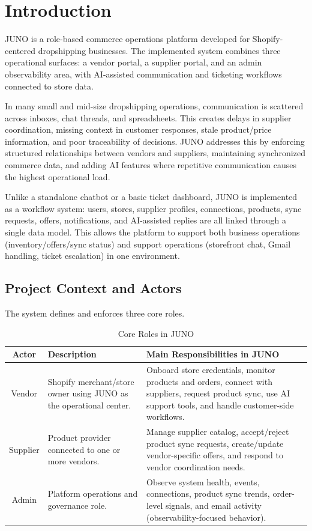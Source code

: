 \chapter{Introduction}
\label{sec:introduction}

JUNO is a role-based commerce operations platform developed for Shopify-centered dropshipping businesses. The implemented system combines three operational surfaces: a vendor portal, a supplier portal, and an admin observability area, with AI-assisted communication and ticketing workflows connected to store data.

In many small and mid-size dropshipping operations, communication is scattered across inboxes, chat threads, and spreadsheets. This creates delays in supplier coordination, missing context in customer responses, stale product/price information, and poor traceability of decisions. JUNO addresses this by enforcing structured relationships between vendors and suppliers, maintaining synchronized commerce data, and adding AI features where repetitive communication causes the highest operational load.

Unlike a standalone chatbot or a basic ticket dashboard, JUNO is implemented as a workflow system: users, stores, supplier profiles, connections, products, sync requests, offers, notifications, and AI-assisted replies are all linked through a single data model. This allows the platform to support both business operations (inventory/offers/sync status) and support operations (storefront chat, Gmail handling, ticket escalation) in one environment.

\section{Project Context and Actors}

The system defines and enforces three core roles.

\begin{table}[H]
\centering
\caption{Core Roles in JUNO}
\begin{tabular}{|c|p{5cm}|p{5cm}|}
\hline
\textbf{Actor} & \textbf{Description} & \textbf{Main Responsibilities in JUNO} \\ \hline
Vendor & Shopify merchant/store owner using JUNO as the operational center. & Onboard store credentials, monitor products and orders, connect with suppliers, request product sync, use AI support tools, and handle customer-side workflows. \\ \hline
Supplier & Product provider connected to one or more vendors. & Manage supplier catalog, accept/reject product sync requests, create/update vendor-specific offers, and respond to vendor coordination needs. \\ \hline
Admin & Platform operations and governance role. & Observe system health, events, connections, product sync trends, order-level signals, and email activity (observability-focused behavior). \\ \hline
\end{tabular}
\label{tab:core_roles}
\end{table}

